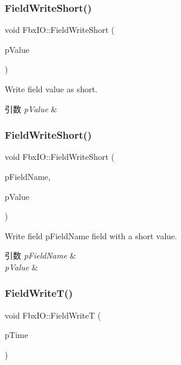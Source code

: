 \subsubsection{\texorpdfstring{Field\+Write\+Short()}{FieldWriteShort()}\hspace{0.1cm}{\footnotesize\ttfamily [1/2]}}
{\footnotesize\ttfamily void Fbx\+I\+O\+::\+Field\+Write\+Short (\begin{DoxyParamCaption}\item[{\hyperlink{fbxtypes_8h_a56e7a4f56baf132527df7c3cd07017b7}{Fbx\+Short}}]{p\+Value }\end{DoxyParamCaption})}

Write field value as short. 
\begin{DoxyParams}{引数}
{\em p\+Value} & \\
\hline
\end{DoxyParams}
\mbox{\label{class_fbx_i_o_aa632506474caebbe7f896a19315bce6a}} 
\subsubsection{\texorpdfstring{Field\+Write\+Short()}{FieldWriteShort()}\hspace{0.1cm}{\footnotesize\ttfamily [2/2]}}
{\footnotesize\ttfamily void Fbx\+I\+O\+::\+Field\+Write\+Short (\begin{DoxyParamCaption}\item[{const char $\ast$}]{p\+Field\+Name,  }\item[{\hyperlink{fbxtypes_8h_a56e7a4f56baf132527df7c3cd07017b7}{Fbx\+Short}}]{p\+Value }\end{DoxyParamCaption})}

Write field p\+Field\+Name field with a short value. 
\begin{DoxyParams}{引数}
{\em p\+Field\+Name} & \\
\hline
{\em p\+Value} & \\
\hline
\end{DoxyParams}
\mbox{\label{class_fbx_i_o_a8bfba5de4219faf4fd55556c6e8f1494}} 
\subsubsection{\texorpdfstring{Field\+Write\+T()}{FieldWriteT()}\hspace{0.1cm}{\footnotesize\ttfamily [1/2]}}
{\footnotesize\ttfamily void Fbx\+I\+O\+::\+Field\+WriteT (\begin{DoxyParamCaption}\item[{\hyperlink{class_fbx_time}{Fbx\+Time}}]{p\+Time }\end{DoxyParamCaption})}

